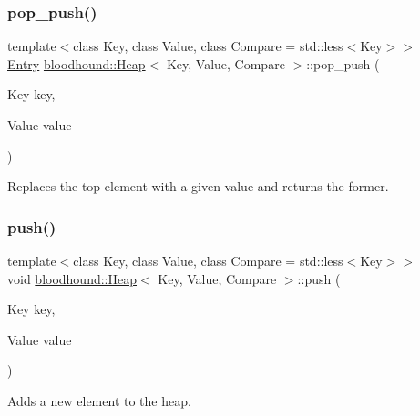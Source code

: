 \subsubsection{\texorpdfstring{pop\+\_\+push()}{pop\_push()}}
{\footnotesize\ttfamily template$<$class Key, class Value, class Compare = std\+::less$<$\+Key$>$$>$ \\
\hyperlink{structbloodhound_1_1Heap_1_1Entry}{Entry} \hyperlink{classbloodhound_1_1Heap}{bloodhound\+::\+Heap}$<$ Key, Value, Compare $>$\+::pop\+\_\+push (\begin{DoxyParamCaption}\item[{Key}]{key,  }\item[{Value}]{value }\end{DoxyParamCaption})\hspace{0.3cm}{\ttfamily [inline]}}



Replaces the top element with a given value and returns the former. 

\mbox{\label{classbloodhound_1_1Heap_af1ded1a305b458eae6d759b6df657632}} 
\subsubsection{\texorpdfstring{push()}{push()}}
{\footnotesize\ttfamily template$<$class Key, class Value, class Compare = std\+::less$<$\+Key$>$$>$ \\
void \hyperlink{classbloodhound_1_1Heap}{bloodhound\+::\+Heap}$<$ Key, Value, Compare $>$\+::push (\begin{DoxyParamCaption}\item[{Key}]{key,  }\item[{Value}]{value }\end{DoxyParamCaption})\hspace{0.3cm}{\ttfamily [inline]}}



Adds a new element to the heap. 

\mbox{\label{classbloodhound_1_1Heap_ab4abf883beaba0f75992267a6fe31133}} 
